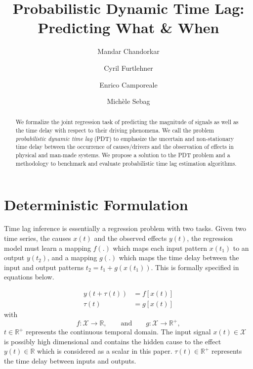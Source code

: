 \documentclass[envcountsect,runningheads]{llncs}
\theoremstyle{etoile}
\begin{document}
%
\title{Probabilistic Dynamic Time Lag: Predicting What \& When}
%
%
\author{Mandar Chandorkar \and
Cyril Furtlehner \and
Enrico Camporeale \and 
Mich\`ele Sebag
}
%
%
%
\maketitle              %
%
\begin{abstract}
      We formalize the joint regression task of predicting the magnitude of signals as well as the time delay with respect to their driving phenomena. 
      We call the problem \emph{probabilistic dynamic time lag} (PDT) to emphasize the uncertain and non-stationary time delay between the occurrence of 
      causes/drivers and the observation of effects in physical and man-made systems. We propose a solution to the PDT problem and a methodology to 
      benchmark and evaluate probabilistic time lag estimation algorithms.
\end{abstract}



\section{Deterministic Formulation}\label{sec:formulation}

Time lag inference is essentially a regression problem with two tasks. 
Given two time series, the causes $x(t)$ and the observed effects $y(t)$, the regression model 
must learn a mapping $f(.)$ which maps each input pattern $x(t_1)$ to an output $y(t_2)$, and a 
mapping $g(.)$ which maps the time delay between the input and output patterns $t_2 = t_1 + g(x(t_1))$. 
This is formally specified in equations below.

\begin{align}
y(t + \tau(t)) & = f[x(t)]\label{eq:pb1}\\
\tau(t) & = g[x(t)]\label{eq:pb2} 
\end{align}
with
\[
f: \mathcal{X}  \rightarrow \mathbb{R},\qquad\text{and}\qquad
g: \mathcal{X}  \rightarrow \mathbb{R}^{+},
\]
$t \in \mathbb{R}^{+}$ represents the continuous temporal domain. The input signal 
$x(t)\in \mathcal{X}$ is possibly high dimensional and contains the hidden cause to 
the effect $y(t)\in\mathbb{R}$ which is considered as a scalar in this paper. 
$\tau(t)\in \mathbb{R}^+$ represents the time delay between inputs and outputs.
\end{document}
